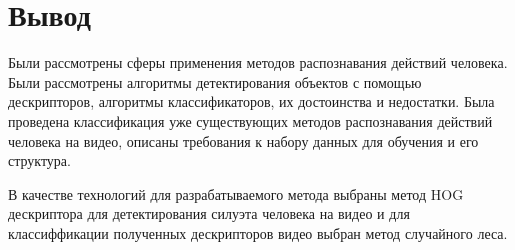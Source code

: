 \section*{Вывод}
Были рассмотрены сферы применения методов распознавания действий человека.
Были рассмотрены алгоритмы детектирования объектов с помощью дескрипторов, алгоритмы классификаторов, их достоинства и недостатки.
Была проведена классификация уже существующих методов распознавания действий человека на видео, описаны требования к набору данных для обучения и его структура.

В качестве технологий для разрабатываемого метода выбраны метод HOG дескриптора для детектирования силуэта человека на видео и для классиффикации полученных дескрипторов видео выбран метод случайного леса.